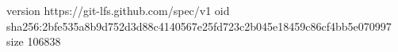 version https://git-lfs.github.com/spec/v1
oid sha256:2bfe535a8b9d752d3d88c4140567e25fd723c2b045e18459c86cf4bb5e070997
size 106838
